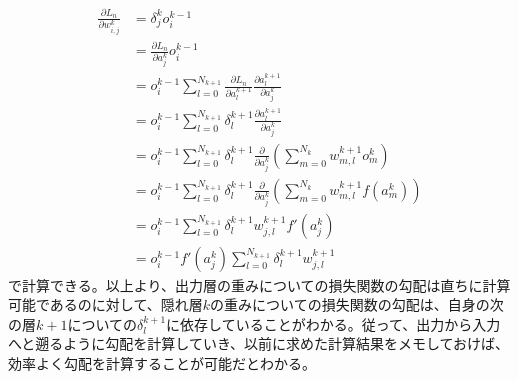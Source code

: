 \documentclass[12pt]{jarticle}
\numberwithin{equation}{section}    %
\numberwithin{figure}{section}      %
\numberwithin{table}{section}      %
\begin{document}
\begin{align}
    \frac{\partial L_{n}}{\partial w_{i, j}^{k}} & = \delta_{j}^{k} o_{i}^{k - 1}                                                                                                                                    \\
                                                 & = \frac{\partial L_{n}}{\partial a_{j}^{k}} o_{i}^{k - 1}                                                                                                         \\
                                                 & = o_{i}^{k - 1} \sum_{l = 0}^{N_{k + 1}} \frac{\partial L_{n}}{\partial a_{l}^{k + 1}} \frac{\partial a_{l}^{k + 1}}{\partial a_{j}^{k}}                          \\
                                                 & = o_{i}^{k - 1} \sum_{l = 0}^{N_{k + 1}} \delta_{l}^{k + 1} \frac{\partial a_{l}^{k + 1}}{\partial a_{j}^{k}}                                                     \\
                                                 & = o_{i}^{k - 1} \sum_{l = 0}^{N_{k + 1}} \delta_{l}^{k + 1} \frac{\partial}{\partial a_{j}^{k}} \left( \sum_{m = 0}^{N_{k}} w_{m, l}^{k + 1} o_{m}^{k} \right)    \\
                                                 & = o_{i}^{k - 1} \sum_{l = 0}^{N_{k + 1}} \delta_{l}^{k + 1} \frac{\partial}{\partial a_{j}^{k}} \left( \sum_{m = 0}^{N_{k}} w_{m, l}^{k + 1} f(a_{m}^{k}) \right) \\
                                                 & = o_{i}^{k - 1} \sum_{l = 0}^{N_{k + 1}} \delta_{l}^{k + 1} w_{j, l}^{k + 1} f'(a_{j}^{k})                                                                        \\
                                                 & = o_{i}^{k - 1} f'(a_{j}^{k}) \sum_{l = 0}^{N_{k + 1}} \delta_{l}^{k + 1} w_{j, l}^{k + 1}
\end{align}
で計算できる。以上より、出力層の重みについての損失関数の勾配は直ちに計算可能であるのに対して、隠れ層$k$の重みについての損失関数の勾配は、自身の次の層$k + 1$についての$\delta_{l}^{k + 1}$に依存していることがわかる。従って、出力から入力へと遡るように勾配を計算していき、以前に求めた計算結果をメモしておけば、効率よく勾配を計算することが可能だとわかる。
\end{document}
